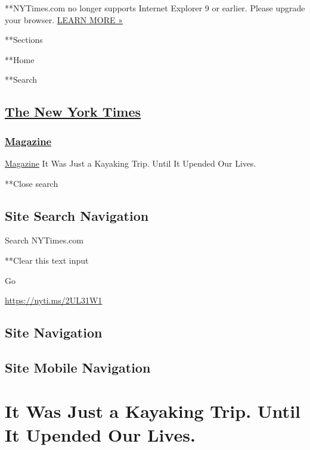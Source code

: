 **NYTimes.com no longer supports Internet Explorer 9 or earlier. Please
upgrade your browser.
\href{http://www.nytimes3xbfgragh.onion/content/help/site/ie9-support.html}{LEARN
MORE »}

**Sections

**Home

**Search

\hypertarget{the-new-york-times}{%
\subsection{\texorpdfstring{\href{http://www.nytimes3xbfgragh.onion/}{The
New York Times}}{The New York Times}}\label{the-new-york-times}}

\hypertarget{-magazine-}{%
\subsubsection{\texorpdfstring{
\href{https://www.nytimes3xbfgragh.onion/section/magazine}{Magazine}
}{ Magazine }}\label{-magazine-}}

 \href{https://www.nytimes3xbfgragh.onion/section/magazine}{Magazine}
\textbar{}It Was Just a Kayaking Trip. Until It Upended Our Lives.

**Close search

\hypertarget{site-search-navigation}{%
\subsection{Site Search Navigation}\label{site-search-navigation}}

Search NYTimes.com

**Clear this text input

Go

\url{https://nyti.ms/2UL31W1}

\hypertarget{site-navigation}{%
\subsection{Site Navigation}\label{site-navigation}}

\hypertarget{site-mobile-navigation}{%
\subsection{Site Mobile Navigation}\label{site-mobile-navigation}}

\hypertarget{it-was-just-a-kayaking-trip-until-it-upended-our-lives}{%
\section{It Was Just a Kayaking Trip. Until It Upended Our
Lives.}\label{it-was-just-a-kayaking-trip-until-it-upended-our-lives}}

